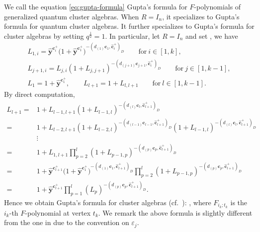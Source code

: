\documentclass[10pt,a4paper]{amsart}
\numberwithin{equation}{section}
\begin{document}
\begin{Remark}
 We call the equation \eqref{eq:gupta-formula} Gupta's formula for $F$-polynomials of generalized quantum cluster algebras. When $R=I_n$, it specializes to Gupta's formula
 for quantum cluster algebras. It further specializes to Gupta's formula \cite{gupta2019,LMN2023} for cluster algebras by setting $q^{\frac{1}{2}}=1$. In particular, let $R=I_n$ and set , we have
 \begin{gather*}
L_{1,i}=\hat{\mathbf{y}}^{\mathbf{c}_{i}^+}\bigl(1+\hat{\mathbf{y}}^{\mathbf{c}_{1}^{+}}\bigr)^{-(d_{(1)}\mathbf{c}_{1},\hat{\mathbf{c}}_{i}^{+})_{D}}\qquad \text{for} \ i\in[1,k],\\
L_{j+1,i}=L_{j,i}(1+L_{j,j+1})^{-(d_{(j+1)}\mathbf{c}_{j+1},\hat{\mathbf{c}}_{i}^{+})_D}\qquad \text{for} \  j\in[1,k-1],\\
L_{1}=1+\hat{\mathbf{y}}^{\mathbf{c}_{1}^{+}},\qquad
L_{l+1}=1+L_{l,l+1}\qquad \text{for} \  l\in[1,k-1].
\end{gather*}
By direct computation,
\begin{align*}
 L_{l+1}={}&1+L_{l-1,l+1}(1+L_{l-1,l})^{-(d_{(l)}\mathbf{c}_{l},\hat{\mathbf{c}}_{l+1}^{+})_D}\\
 ={}&1+L_{l-2,l+1}(1+L_{l-2,l})^{-(d_{(l-1)}\mathbf{c}_{l-1},\hat{\mathbf{c}}_{l+1}^{+})_D}(1+L_{l-1,l})^{-(d_{(l)}\mathbf{c}_{l},\hat{\mathbf{c}}_{l+1}^{+})_D}\\
 & \vdots\\
 ={}&1+L_{1,l+1}\prod\limits^{l}_{p=2}(1+L_{p-1,p})^{-(d_{(p)}\mathbf{c}_{p},\hat{\mathbf{c}}_{l+1}^{+})_D}\\
 ={}&1+\hat{\mathbf{y}}^{\mathbf{c}_{l+1}^{+}}\bigl(1+\hat{\mathbf{y}}^{\mathbf{c}_{1}^{+}}\bigr)^{-(d_{(1)}\mathbf{c}_{1},\hat{\mathbf{c}}_{l+1}^{+})_D}\prod\limits^{l}_{p=2}(1+L_{p-1,p})^{-(d_{(p)}\mathbf{c}_{p},\hat{\mathbf{c}}_{l+1}^{+})_D}\\
={}&1+\hat{\mathbf{y}}^{\mathbf{c}_{l+1}^{+}}\prod\limits^{l}_{p=1}(L_{p})^{-(d_{(p)}\mathbf{c}_{p},\hat{\mathbf{c}}_{l+1}^{+})_D}.
\end{align*}
Hence we obtain Gupta's formula for cluster algebras (cf.\ \cite{LMN2023}):
,
where $F_{i_k;t_k}$ is the $i_k$-th $F$-polynomial at vertex $t_k$. We remark the above formula is slightly different from the one in \cite{LMN2023} due to the convention on $\varepsilon_j$.
\end{Remark}
\end{document}
